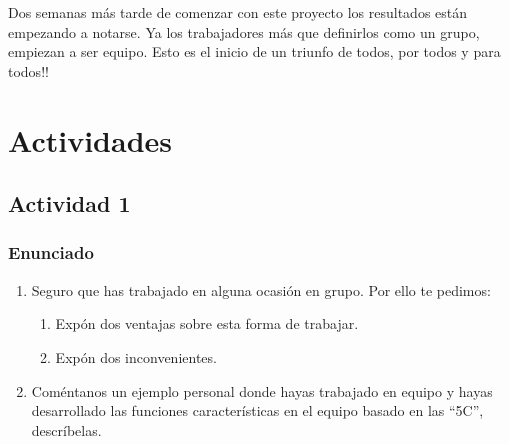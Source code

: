 Dos semanas más tarde de comenzar con este proyecto los resultados están empezando a notarse. Ya los trabajadores más que definirlos como un grupo, empiezan a ser equipo. Esto es  el inicio de  un triunfo de todos, por todos y para todos!!

\section{Actividades}

\subsection{Actividad 1}

\subsubsection{Enunciado}
\begin{enumerate}
    \item Seguro que has trabajado en alguna ocasión en grupo. Por ello te pedimos:
    \begin{enumerate}
        \item Expón dos ventajas sobre esta forma de trabajar.
        \item Expón dos inconvenientes.
    \end{enumerate}
    \item Coméntanos un ejemplo personal donde hayas trabajado en equipo y hayas desarrollado las funciones características en el equipo basado en las “5C”, descríbelas.
\end{enumerate}

